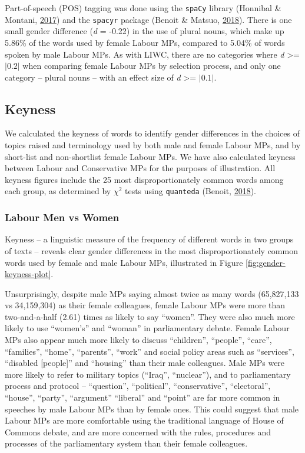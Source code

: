 \documentclass[]{article}
\theoremstyle{definition}
\theoremstyle{definition}
\theoremstyle{definition}
\theoremstyle{remark}
\begin{document}
Part-of-speech (POS) tagging was done using the \texttt{spaCy} library
(Honnibal \& Montani, \protect\hyperlink{ref-honnibal2017}{2017}) and
the \texttt{spacyr} package (Benoit \& Matsuo,
\protect\hyperlink{ref-benoit2018a}{2018}). There is one small gender
difference (\emph{d} = -0.22) in the use of plural nouns, which make up
5.86\% of the words used by female Labour MPs, compared to 5.04\% of
words spoken by male Labour MPs. As with LIWC, there are no categories
where \emph{d} \textgreater{}= \(|0.2|\) when comparing female Labour
MPs by selection process, and only one category -- plural nouns -- with
an effect size of \emph{d} \textgreater{}= \(|0.1|\).

\hypertarget{keyness}{%
\subsection{Keyness}\label{keyness}}

We calculated the keyness of words to identify gender differences in the
choices of topics raised and terminology used by both male and female
Labour MPs, and by short-list and non-shortlist female Labour MPs. We
have also calculated keyness between Labour and Conservative MPs for the
purposes of illustration. All keyness figures include the 25 most
disproportionately common words among each group, as determined by
\({\chi}^2\) tests using \texttt{quanteda} (Benoit,
\protect\hyperlink{ref-benoit2018}{2018}).

\hypertarget{labour-men-vs-women}{%
\subsubsection{Labour Men vs Women}\label{labour-men-vs-women}}

Keyness -- a linguistic measure of the frequency of different words in
two groups of texts -- reveals clear gender differences in the most
disproportionately common words used by female and male Labour MPs,
illustrated in Figure \ref{fig:gender-keyness-plot}.

Unsurprisingly, despite male MPs saying almost twice as many words
(65,827,133 vs 34,159,304) as their female colleagues, female Labour MPs
were more than two-and-a-half (2.61) times as likely to say ``women''.
They were also much more likely to use ``women's'' and ``woman'' in
parliamentary debate. Female Labour MPs also appear much more likely to
discuss ``children'', ``people'', ``care'', ``families'', ``home'',
``parents'', ``work'' and social policy areas such as ``services'',
``disabled {[}people{]}'' and ``housing'' than their male colleagues.
Male MPs were more likely to refer to military topics (``Iraq'',
``nuclear''), and to parliamentary process and protocol -- ``question'',
``political'', ``conservative'', ``electoral'', ``house'', ``party'',
``argument'' ``liberal'' and ``point'' are far more common in speeches
by male Labour MPs than by female ones. This could suggest that male
Labour MPs are more comfortable using the traditional language of House
of Commons debate, and are more concerned with the rules, procedures and
processes of the parliamentary system than their female colleagues.
\end{document}

